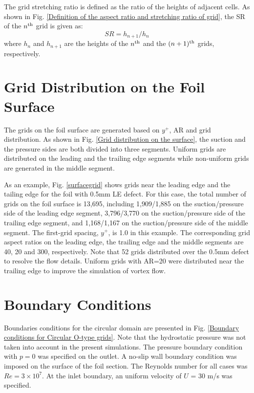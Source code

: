 \documentclass[onecolumn,11pt]{report}
\begin{document}
The grid stretching ratio is defined as the ratio of the heights of adjacent cells. As shown in Fig.  \ref{Definition of the aspect ratio and stretching ratio of grid}, the SR of the $n^{\rm th}$ grid is given as:
\begin{equation}
SR = h_{n+1}/h_n
\label{eq26}
\end{equation}
where $h_n$ and $h_{n+1}$ are the heights of the $n^{\rm th}$ and the $(n+1)^{\rm th}$ grids, respectively.

\section{Grid Distribution on the Foil Surface}



The grids on the foil surface are generated based on $y^+$, AR and grid distribution. As shown in Fig. \ref{Grid distribution on the surface}, the suction and the pressure sides are both divided into three segments. Uniform grids are distributed on the leading and the trailing edge segments while non-uniform grids are generated in the middle segment. 

As an example, Fig. \ref{surfacegrid} shows grids near the leading edge and the tailing edge for the foil with 0.5mm LE defect. For this case, the total number of grids on the foil surface is 13,695, including 1,909/1,885 on the suction/pressure side of the leading edge segment, 3,796/3,770 on the suction/pressure side of the trailing edge segment, and 1,168/1,167 on the suction/pressure side of the middle segment. The first-grid spacing, $y^+$, is 1.0 in this example. The corresponding grid aspect ratios on the leading edge, the trailing edge and the middle segments are 40, 20 and 300, respectively. Note that 52 grids  distributed over the 0.5mm defect to resolve the flow details. Uniform grids with AR=20 were distributed near the trailing edge to improve the simulation of vortex flow. 



\section{Boundary Conditions}

Boundaries conditions for the circular domain are presented in Fig.  \ref{Boundary conditions for Circular O-type grids}. Note that the hydrostatic pressure was not taken into account in the present simulations. The pressure boundary condition with $p=0$ was specified on the outlet. A no-slip wall boundary condition was imposed on the surface of the foil section. The Reynolds number for all cases was $Re=3\times 10^7$. At the inlet boundary, an uniform velocity of $U$ = 30 m/s was specified. 
\end{document}
